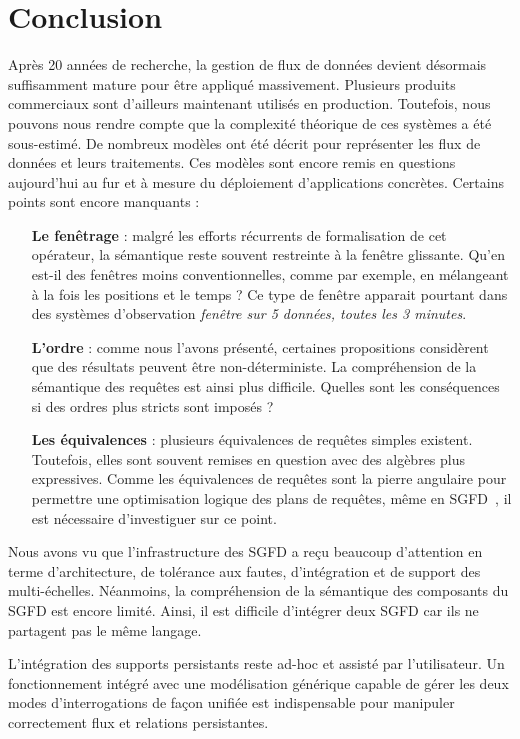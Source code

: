 \section{Conclusion}\label{sec:rw:sgfd:synthese}
Après 20 années de recherche, la gestion de flux de données devient désormais suffisamment mature pour être appliqué massivement. Plusieurs produits commerciaux sont d'ailleurs maintenant utilisés en production. Toutefois, nous pouvons nous rendre compte que la complexité théorique de ces systèmes a été sous-estimé. De nombreux modèles ont été décrit pour représenter les flux de données et leurs traitements. Ces modèles sont encore remis en questions aujourd'hui au fur et à mesure du déploiement d'applications concrètes. Certains points sont encore manquants :
\begin{itemize}
\item[\textbf{Le fenêtrage}] : malgré les efforts récurrents de formalisation de cet opérateur, la sémantique reste souvent restreinte à la fenêtre glissante. Qu'en est-il des fenêtres moins conventionnelles, comme par exemple, en mélangeant à la fois les positions et le temps ? Ce type de fenêtre apparait pourtant dans des systèmes d'observation \textit{fenêtre sur 5 données, toutes les 3 minutes}.
\item[\textbf{L'ordre}] : comme nous l'avons présenté, certaines propositions considèrent que des résultats peuvent être non-déterministe. La compréhension de la sémantique des requêtes est ainsi plus difficile. Quelles sont les conséquences si des ordres plus stricts sont imposés ?
\item[\textbf{Les équivalences}] : plusieurs équivalences de requêtes simples existent. Toutefois, elles sont souvent remises en question avec des algèbres plus expressives. Comme les équivalences de requêtes sont la pierre angulaire pour permettre une optimisation logique des plans de requêtes, même en SGFD~\cite{Slivinskas:temporal,Arasu:stream}, il est nécessaire d'investiguer sur ce point.
\end{itemize}

Nous avons vu que l'infrastructure des SGFD a reçu beaucoup d'attention en terme d'architecture, de tolérance aux fautes, d'intégration et de support des multi-échelles. Néanmoins, la compréhension de la sémantique des composants du SGFD est encore limité. Ainsi, il est difficile d'intégrer deux SGFD car ils ne partagent pas le même langage.

L'intégration des supports persistants reste ad-hoc et assisté par l'utilisateur. Un fonctionnement intégré avec une modélisation générique capable de gérer les deux modes d'interrogations de façon unifiée est indispensable pour manipuler correctement flux et relations persistantes.


